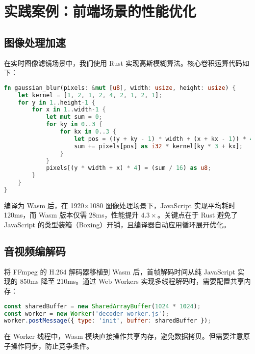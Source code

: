 \chapter{实践案例：前端场景的性能优化}
\section{图像处理加速}
在实时图像滤镜场景中，我们使用 Rust 实现高斯模糊算法。核心卷积运算代码如下：\par
\begin{lstlisting}[language=rust]
fn gaussian_blur(pixels: &mut [u8], width: usize, height: usize) {
    let kernel = [1, 2, 1, 2, 4, 2, 1, 2, 1];
    for y in 1..height-1 {
        for x in 1..width-1 {
            let mut sum = 0;
            for ky in 0..3 {
                for kx in 0..3 {
                    let pos = ((y + ky - 1) * width + (x + kx - 1)) * 4;
                    sum += pixels[pos] as i32 * kernel[ky * 3 + kx];
                }
            }
            pixels[(y * width + x) * 4] = (sum / 16) as u8;
        }
    }
}
\end{lstlisting}
编译为 Wasm 后，在 1920×1080 图像处理场景下，JavaScript 实现平均耗时 120ms，而 Wasm 版本仅需 28ms，性能提升 $4.3\times$。关键点在于 Rust 避免了 JavaScript 的类型装箱（Boxing）开销，且编译器自动应用循环展开优化。\par
\section{音视频编解码}
将 FFmpeg 的 H.264 解码器移植到 Wasm 后，首帧解码时间从纯 JavaScript 实现的 850ms 降至 210ms。通过 Web Workers 实现多线程解码时，需要配置共享内存：\par
\begin{lstlisting}[language=javascript]
const sharedBuffer = new SharedArrayBuffer(1024 * 1024);
const worker = new Worker('decoder-worker.js');
worker.postMessage({ type: 'init', buffer: sharedBuffer });
\end{lstlisting}
在 Worker 线程中，Wasm 模块直接操作共享内存，避免数据拷贝。但需要注意原子操作同步，防止竞争条件。\par
